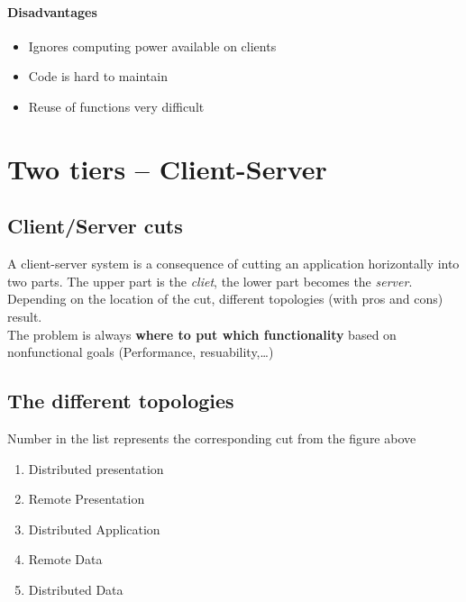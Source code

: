 		\paragraph{Disadvantages}
			\begin{itemize}
				\item Ignores computing power available on clients
				\item Code is hard to maintain
				\item Reuse of functions very difficult
			\end{itemize}
		
		
	\section{Two tiers -- Client-Server}
		\subsection{Client/Server cuts}
			A client-server system is a consequence of cutting an application horizontally into two parts. The upper part is the \textit{cliet}, the lower part becomes the \textit{server}.
			Depending on the location of the cut, different topologies (with pros and cons) result.\\
			The problem is always \textbf{where to put	which functionality} based on nonfunctional goals
(Performance, resuability,\ldots)
			
		\subsection{The different topologies}
			Number in the list represents the corresponding cut from the figure above
			\begin{enumerate}
				\item Distributed presentation
				\item Remote Presentation
				\item Distributed Application
				\item Remote Data
				\item Distributed Data
			\end{enumerate}
		

